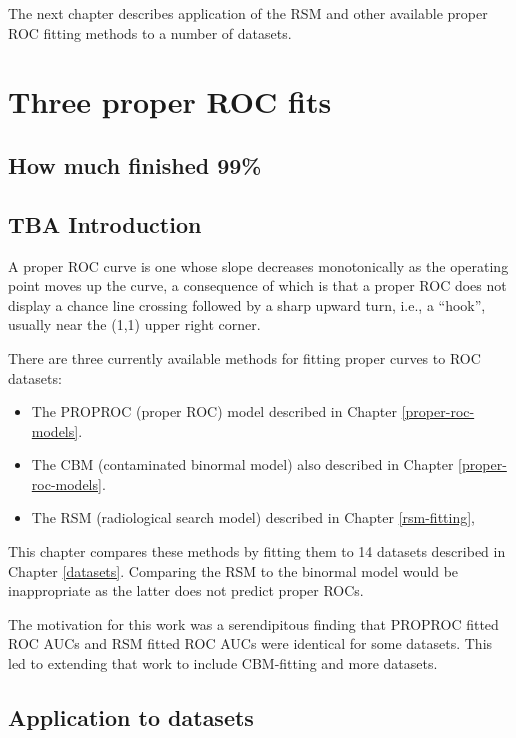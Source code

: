 \documentclass[
]{book}
\providecommand{\tightlist}{%
  \setlength{\itemsep}{0pt}\setlength{\parskip}{0pt}}
\begin{document}
The next chapter describes application of the RSM and other available proper ROC fitting methods to a number of datasets.

\hypertarget{rsm-3-fits}{%
\chapter{Three proper ROC fits}\label{rsm-3-fits}}

\hypertarget{rsm-3-fits-how-much-finished}{%
\section{How much finished 99\%}\label{rsm-3-fits-how-much-finished}}

\hypertarget{rsm-3-fits-intro}{%
\section{TBA Introduction}\label{rsm-3-fits-intro}}

A proper ROC curve is one whose slope decreases monotonically as the operating point moves up the curve, a consequence of which is that a proper ROC does not display a chance line crossing followed by a sharp upward turn, i.e., a ``hook'', usually near the (1,1) upper right corner.

There are three currently available methods for fitting proper curves to ROC datasets:

\begin{itemize}
\tightlist
\item
  The PROPROC (proper ROC) model described in Chapter \ref{proper-roc-models}.
\item
  The CBM (contaminated binormal model) also described in Chapter \ref{proper-roc-models}.
\item
  The RSM (radiological search model) described in Chapter \ref{rsm-fitting},
\end{itemize}

This chapter compares these methods by fitting them to 14 datasets described in Chapter \ref{datasets}. Comparing the RSM to the binormal model would be inappropriate as the latter does not predict proper ROCs.

The motivation for this work was a serendipitous finding \citep{chakraborty2011estimating} that PROPROC fitted ROC AUCs and RSM fitted ROC AUCs were identical for some datasets. This led to extending that work to include CBM-fitting and more datasets.

\hypertarget{rsm-3-fits-applications}{%
\section{Application to datasets}\label{rsm-3-fits-applications}}
\end{document}
